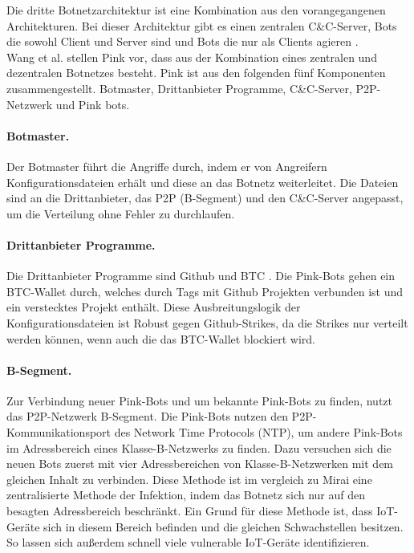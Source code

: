 Die dritte Botnetzarchitektur ist eine Kombination aus den vorangegangenen Architekturen. Bei dieser Architektur gibt es einen zentralen C\&C-Server, Bots die sowohl Client und Server sind und Bots die nur als Clients agieren \cite{10.1007/978-3-030-33229-7_21}. \\[0.2in]

Wang et al. stellen Pink \cite{DBLP:conf/colcom/WangSZLGD22} vor, dass aus der Kombination eines zentralen und dezentralen Botnetzes besteht. Pink ist aus den folgenden fünf Komponenten zusammengestellt. Botmaster, Drittanbieter Programme, C\&C-Server, P2P-Netzwerk und Pink bots.

\paragraph{Botmaster.} Der Botmaster führt die Angriffe durch, indem er von Angreifern Konfigurationsdateien erhält und diese an das Botnetz weiterleitet. Die Dateien sind an die Drittanbieter, das P2P (B-Segment) und den C\&C-Server angepasst, um die Verteilung ohne Fehler zu durchlaufen. 
\paragraph{Drittanbieter Programme.} Die Drittanbieter Programme sind Github \cite{DBLP:conf/msr/KalliamvakouGBSGD14} und BTC \cite{DBLP:conf/icccn/Sidhu17}. Die Pink-Bots gehen ein BTC-Wallet durch, welches durch Tags mit Github Projekten verbunden ist und ein verstecktes Projekt enthält. Diese Ausbreitungslogik der Konfigurationsdateien ist Robust gegen Github-Strikes, da die Strikes nur verteilt werden können, wenn auch die das BTC-Wallet blockiert wird. 
\paragraph{B-Segment.} Zur Verbindung neuer Pink-Bots und um bekannte Pink-Bots zu finden, nutzt das P2P-Netzwerk B-Segment. Die Pink-Bots nutzen den P2P-Kommunikationsport des Network Time Protocols (NTP), um andere Pink-Bots im Adressbereich eines Klasse-B-Netzwerks zu finden. Dazu versuchen sich die neuen Bots zuerst mit vier Adressbereichen von Klasse-B-Netzwerken mit dem gleichen Inhalt zu verbinden. Diese Methode ist im vergleich zu Mirai \cite{DBLP:conf/uss/AntonakakisABBB17} eine zentralisierte Methode der Infektion, indem das Botnetz sich nur auf den besagten Adressbereich beschränkt. Ein Grund für diese Methode ist, dass IoT-Geräte sich in diesem Bereich befinden und die gleichen Schwachstellen besitzen. So lassen sich außerdem schnell viele vulnerable IoT-Geräte identifizieren.
